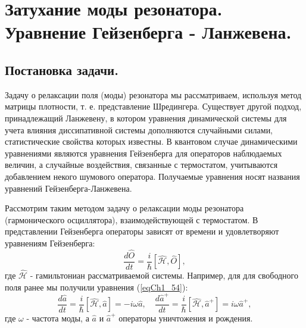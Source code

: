 \section{Затухание моды резонатора. Уравнение Гейзенберга - Ланжевена.}

\subsection{Постановка задачи.}
Задачу о релаксации поля (моды) резонатора мы рассматриваем, используя
метод матрицы плотности, т. е. представление Шредингера. Существует
другой подход, принадлежащий Ланжевену, в котором уравнения
динамической системы для учета влияния диссипативной системы
дополняются случайными силами, статистические свойства которых
известны. В квантовом случае динамическими уравнениями являются
уравнения Гейзенберга для операторов наблюдаемых величин, а случайные
воздействия, связанные с термостатом, учитываются добавлением некого
шумового оператора. Получаемые уравнения носят названия уравнений
Гейзенберга-Ланжевена.

Рассмотрим таким методом задачу о релаксации моды резонатора
(гармонического осциллятора), взаимодействующей с термостатом. В
представлении Гейзенберга операторы зависят от времени и удовлетворяют
уравнениям Гейзенберга:
\begin{equation}
\frac{d \hat{O}}{dt} = \frac{i}{\hbar}
\left[\hat{\mathcal{H}}, \hat{O}\right],
\nonumber
\end{equation}
где $\hat{\mathcal{H}}$ - гамильтониан рассматриваемой
системы. Например, для для свободного поля ранее мы получили уравнения
(\ref{eqCh1_54}):
\begin{equation}
\frac{d \hat{a}}{d t} = \frac{i}{\hbar}\left[\hat{\mathcal{H}},
  \hat{a}\right] = -i \omega \hat{a}, \quad
\frac{d \hat{a}^{+}}{dt} = \frac{i}{\hbar}\left[\hat{\mathcal{H}},
  \hat{a}^{+}\right] = i \omega \hat{a}^{+},
\nonumber
\end{equation}
где $\omega$ - частота моды, а $\hat{a}$ и $\hat{a}^{+}$ операторы
уничтожения и рождения.



